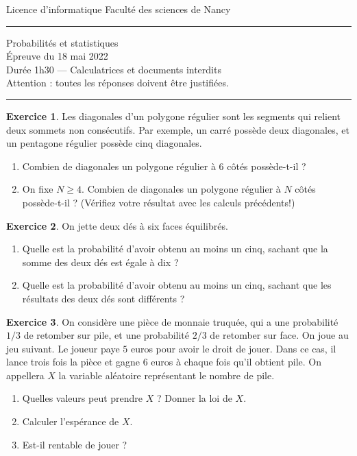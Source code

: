 \documentclass[11pt]{article}
\theoremstyle{definition}
\newtheorem{exo}{Exercice}
\begin{document}
\noindent Licence d'informatique \hfill Faculté des sciences de Nancy\\
\noindent\rule{\linewidth}{1pt}
\begin{center}
Probabilités et statistiques\\
Épreuve du 18 mai 2022\\
Durée 1h30 --- Calculatrices et documents interdits\\
Attention : toutes les réponses doivent être justifiées.
\end{center}
\noindent\rule{\linewidth}{1pt}




\begin{exo}
Les diagonales d'un polygone régulier sont les segments qui relient deux sommets non consécutifs. Par exemple, un carré possède deux diagonales, et un pentagone régulier possède cinq diagonales.

\begin{enumerate}
\item Combien de diagonales un polygone régulier à 6 côtés possède-t-il ?
\item On fixe $N\geq 4$. Combien de diagonales un polygone régulier à $N$ côtés possède-t-il ? (Vérifiez votre résultat avec les calculs précédents!)
\end{enumerate}
\end{exo}


\begin{exo}
On jette deux dés à six faces équilibrés.
\begin{enumerate}
\item Quelle est la probabilité d'avoir obtenu au moins un cinq, sachant que la somme des deux dés est égale à dix ?
\item Quelle est la probabilité d'avoir obtenu au moins un cinq, sachant que les résultats des deux dés sont différents ?
\end{enumerate}
\end{exo}



\begin{exo}
On considère une pièce de monnaie truquée, qui a une probabilité $1/3$ de retomber sur pile, et une probabilité $2/3$ de retomber sur face. On joue au jeu suivant. Le joueur paye $5$ euros pour avoir le droit de jouer. Dans ce cas, il lance trois fois la pièce et gagne $6$ euros à chaque fois qu'il obtient pile.
On appellera $X$ la variable aléatoire représentant le nombre de pile.
\begin{enumerate}
\item Quelles valeurs peut prendre $X$ ? Donner la loi de $X$.
\item Calculer l'espérance de $X$.
\item Est-il rentable de jouer ?
\end{enumerate}
\end{exo}
\end{document}
